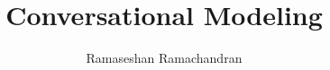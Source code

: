 
\title{Conversational Modeling}
\author[]{Ramaseshan Ramachandran}
\date{}
	\maketitle
	
	
%	
%    
%    
%    

%    
